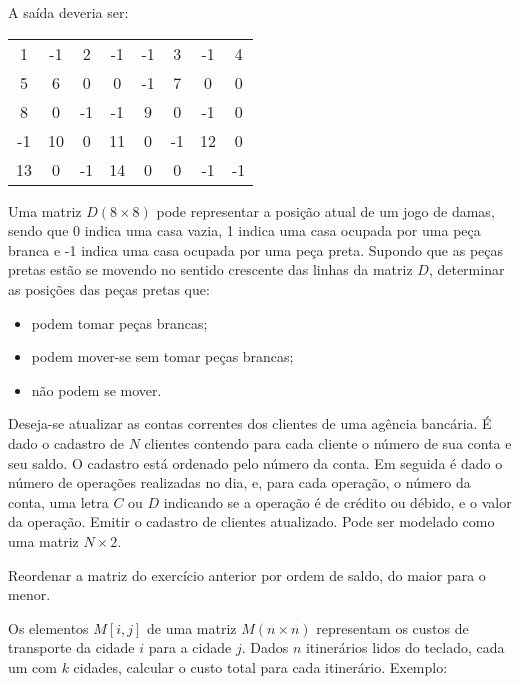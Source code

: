 A saída deveria ser:
\begin{center}
\begin{tabular}{cccccccc}
 1 & -1 &  2 & -1 & -1 &  3 & -1 &  4 \\
 5 &  6 &  0 &  0 & -1 &  7 &  0 &  0 \\
 8 &  0 & -1 & -1 &  9 &  0 & -1 &  0\\
-1 & 10 &  0 & 11 &  0 & -1 & 12 &  0\\
13 &  0 & -1 & 14 &  0 &  0 & -1 & -1\\
\end{tabular}
\end{center}

\item Uma matriz $D (8 \times 8)$ 
pode representar a posição atual de um jogo de damas, 
sendo que 0 indica uma casa vazia, 1 indica uma casa ocupada por uma peça branca
e -1 indica uma casa ocupada por uma peça preta. Supondo que as peças pretas
estão se movendo no sentido crescente das linhas da matriz $D$, determinar
as posições das peças pretas que:

\begin{itemize}
\item podem tomar peças brancas;
\item podem mover-se sem tomar peças brancas;
\item não podem se mover.
\end{itemize}

\item Deseja-se atualizar as contas correntes dos clientes de uma agência
bancária. É dado o cadastro de $N$ clientes contendo para cada cliente
o número de sua conta e seu saldo. O cadastro está ordenado pelo número 
da conta. Em seguida é dado o número de operações realizadas no dia, e, 
para cada operação, o número da conta, uma letra $C$ ou $D$ indicando se a
operação é de crédito ou débido, e o valor da operação. Emitir o cadastro
de clientes atualizado. Pode ser modelado como uma matriz $N \times 2$.


\item Reordenar a matriz do exercício anterior 
por ordem de saldo, do maior para o menor. 


\item Os elementos $M[i,j]$ de uma matriz $M (n \times n)$ 
representam os custos de
transporte da cidade $i$ para a cidade $j$. Dados $n$ itinerários lidos
do teclado, cada um
com $k$ cidades, calcular o custo total para cada itinerário. Exemplo:

